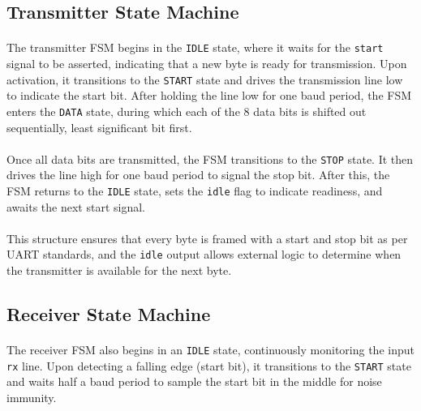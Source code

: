 \documentclass[12pt]{report}
\begin{document}
\subsection{Transmitter State Machine}

\paragraph{}
The transmitter FSM begins in the \texttt{IDLE} state, where it waits for the \texttt{start} signal to be asserted, indicating that a new byte is ready for transmission. Upon activation, it transitions to the \texttt{START} state and drives the transmission line low to indicate the start bit. After holding the line low for one baud period, the FSM enters the \texttt{DATA} state, during which each of the 8 data bits is shifted out sequentially, least significant bit first.

\paragraph{}
Once all data bits are transmitted, the FSM transitions to the \texttt{STOP} state. It then drives the line high for one baud period to signal the stop bit. After this, the FSM returns to the \texttt{IDLE} state, sets the \texttt{idle} flag to indicate readiness, and awaits the next start signal.

\paragraph{}
This structure ensures that every byte is framed with a start and stop bit as per UART standards, and the \texttt{idle} output allows external logic to determine when the transmitter is available for the next byte.

\subsection{Receiver State Machine}

\paragraph{}
The receiver FSM also begins in an \texttt{IDLE} state, continuously monitoring the input \texttt{rx} line. Upon detecting a falling edge (start bit), it transitions to the \texttt{START} state and waits half a baud period to sample the start bit in the middle for noise immunity.
\end{document}
